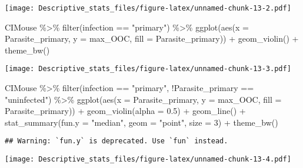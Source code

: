 \documentclass[
]{article}
\newenvironment{Shaded}{\begin{snugshade}}{\end{snugshade}}
\newcommand{\AttributeTok}[1]{\textcolor[rgb]{0.77,0.63,0.00}{#1}}
\newcommand{\DecValTok}[1]{\textcolor[rgb]{0.00,0.00,0.81}{#1}}
\newcommand{\FloatTok}[1]{\textcolor[rgb]{0.00,0.00,0.81}{#1}}
\newcommand{\FunctionTok}[1]{\textcolor[rgb]{0.00,0.00,0.00}{#1}}
\newcommand{\NormalTok}[1]{#1}
\newcommand{\SpecialCharTok}[1]{\textcolor[rgb]{0.00,0.00,0.00}{#1}}
\newcommand{\StringTok}[1]{\textcolor[rgb]{0.31,0.60,0.02}{#1}}
\begin{document}
\texttt{[image: Descriptive\_stats\_files/figure-latex/unnamed-chunk-13-2.pdf]}

\begin{Shaded}
\begin{Highlighting}[]
\NormalTok{CIMouse  }\SpecialCharTok{\%\textgreater{}\%}
    \FunctionTok{filter}\NormalTok{(infection }\SpecialCharTok{==} \StringTok{"primary"}\NormalTok{)  }\SpecialCharTok{\%\textgreater{}\%}
  \FunctionTok{ggplot}\NormalTok{(}\FunctionTok{aes}\NormalTok{(}\AttributeTok{x =}\NormalTok{ Parasite\_primary, }\AttributeTok{y =}\NormalTok{ max\_OOC, }\AttributeTok{fill =}\NormalTok{ Parasite\_primary)) }\SpecialCharTok{+}
  \FunctionTok{geom\_violin}\NormalTok{() }\SpecialCharTok{+}
    \FunctionTok{theme\_bw}\NormalTok{() }
\end{Highlighting}
\end{Shaded}

\texttt{[image: Descriptive\_stats\_files/figure-latex/unnamed-chunk-13-3.pdf]}

\begin{Shaded}
\begin{Highlighting}[]
\NormalTok{CIMouse  }\SpecialCharTok{\%\textgreater{}\%}
    \FunctionTok{filter}\NormalTok{(infection }\SpecialCharTok{==} \StringTok{"primary"}\NormalTok{, }\SpecialCharTok{!}\NormalTok{Parasite\_primary }\SpecialCharTok{==} \StringTok{"uninfected"}\NormalTok{)  }\SpecialCharTok{\%\textgreater{}\%}
  \FunctionTok{ggplot}\NormalTok{(}\FunctionTok{aes}\NormalTok{(}\AttributeTok{x =}\NormalTok{ Parasite\_primary, }\AttributeTok{y =}\NormalTok{ max\_OOC, }\AttributeTok{fill =}\NormalTok{ Parasite\_primary)) }\SpecialCharTok{+}
  \FunctionTok{geom\_violin}\NormalTok{(}\AttributeTok{alpha =} \FloatTok{0.5}\NormalTok{) }\SpecialCharTok{+}
    \FunctionTok{geom\_line}\NormalTok{() }\SpecialCharTok{+}
     \FunctionTok{stat\_summary}\NormalTok{(}\AttributeTok{fun.y =} \StringTok{"median"}\NormalTok{, }\AttributeTok{geom =} \StringTok{"point"}\NormalTok{, }\AttributeTok{size =} \DecValTok{3}\NormalTok{) }\SpecialCharTok{+}
    \FunctionTok{theme\_bw}\NormalTok{() }
\end{Highlighting}
\end{Shaded}

\begin{verbatim}
## Warning: `fun.y` is deprecated. Use `fun` instead.
\end{verbatim}

\texttt{[image: Descriptive\_stats\_files/figure-latex/unnamed-chunk-13-4.pdf]}
\end{document}
